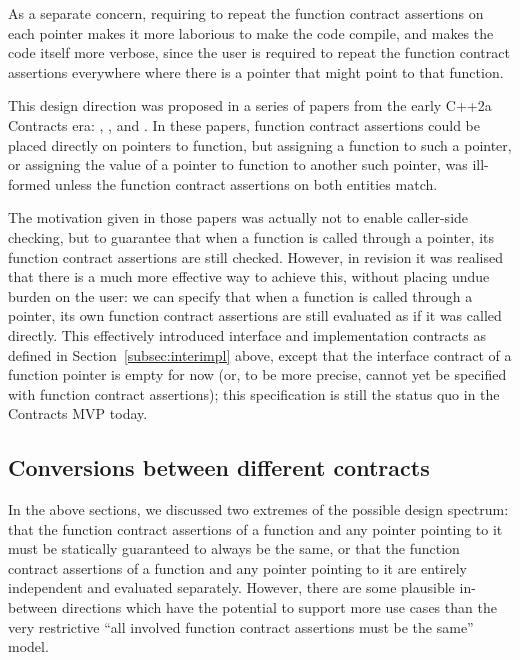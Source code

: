 As a separate concern, requiring to repeat the function contract assertions on each pointer makes it more laborious to make the code compile, and makes the code itself more verbose, since the user is required to repeat the function contract assertions everywhere where there is a pointer that might point to that function.

This design direction was proposed in a series of papers from the early C++2a Contracts era: \cite{N4415}, \cite{P0287R0}, and \cite{P0380R0}. In these papers, function contract assertions could be placed directly on pointers to function, but assigning a function to such a pointer, or assigning the value of a pointer to function to another such pointer, was ill-formed unless the function contract assertions on both entities match.

The motivation given in those papers was actually not to enable caller-side checking, but to guarantee that when a function is called through a pointer, its function contract assertions are still checked. However, in  revision \cite{P0380R1} it was realised that there is a much more effective way to achieve this, without placing undue burden on the user: we can specify that when a function is called through a pointer, its own function contract assertions are still evaluated as if it was called directly. This effectively introduced interface and implementation contracts as defined in Section~\ref{subsec:interimpl} above, except that the interface contract of a function pointer is empty for now (or, to be more precise, cannot yet be specified with function contract assertions); this specification is still the status quo in the Contracts MVP \cite{P2900R7} today.

\subsection{Conversions between different contracts}
\label{subsec:conv}

In the above sections, we discussed two extremes of the possible design spectrum: that the function contract assertions of a function and any pointer pointing to it must be statically guaranteed to always be the same, or that the function contract assertions of a function and any pointer pointing to it are entirely independent and evaluated separately. However, there are some plausible in-between directions which have the potential to support more use cases than the very restrictive ``all involved function contract assertions must be the same'' model.

